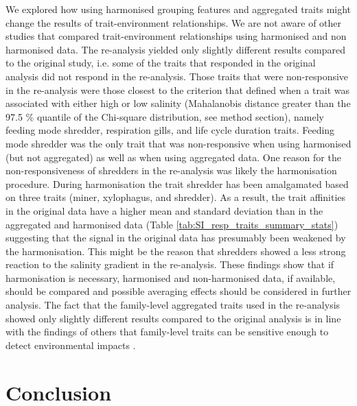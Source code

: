 \documentclass{article}
\begin{document}
We explored how using harmonised grouping features and aggregated traits might change the results of trait-environment relationships. We are not aware of other studies that compared trait-environment relationships using harmonised and non harmonised data. The re-analysis yielded only slightly different results compared to the original study, i.e. some of the traits that responded in the original analysis did not respond in the re-analysis. Those traits that were non-responsive in the re-analysis were those closest to the criterion that defined when a trait was associated with either high or low salinity (Mahalanobis distance greater than the 97.5 \% quantile of the Chi-square distribution, see method section), namely feeding mode shredder, respiration gills, and life cycle duration traits. Feeding mode shredder was the only trait that was non-responsive when using harmonised (but not aggregated) as well as when using aggregated data. One reason for the non-responsiveness of shredders in the re-analysis was likely the harmonisation procedure. During harmonisation the trait shredder has been amalgamated based on three traits (miner, xylophagus, and shredder). As a result, the trait affinities in the original data have a higher mean and standard deviation than in the aggregated and harmonised data (Table \ref{tab:SI_resp_traits_summary_stats}) suggesting that the signal in the original data has presumably been weakened by the harmonisation. This might be the reason that shredders showed a less strong reaction to the salinity gradient in the re-analysis. These findings show that if harmonisation is necessary, harmonised and non-harmonised data, if available, should be compared and possible averaging effects should be considered in further analysis. The fact that the family-level aggregated traits used in the re-analysis showed only slightly different results compared to the original analysis is in line with the findings of others that family-level traits can be sensitive enough to detect environmental impacts \cite{beketov_spear_2009}. %


\section*{Conclusion}
\end{document}
